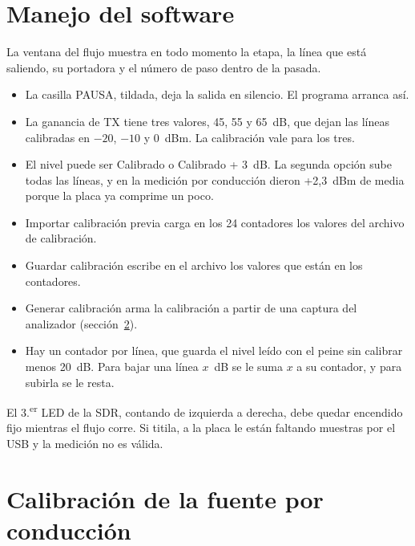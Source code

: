 
\section{Manejo del software}\label{anexo:sw}

La ventana del flujo muestra en todo momento la etapa, la línea que está saliendo, su portadora y el número de paso dentro de la pasada.

\begin{itemize}
  \item La casilla PAUSA, tildada, deja la salida en silencio. El programa arranca así.
  \item La ganancia de TX tiene tres valores, 45, 55 y 65~dB, que dejan las líneas calibradas en $-20$, $-10$ y 0~dBm. La calibración vale para los tres.
  \item El nivel puede ser Calibrado o Calibrado + 3~dB. La segunda opción sube todas las líneas, y en la medición por conducción dieron +2,3~dBm de media porque la placa ya comprime un poco.
  \item Importar calibración previa carga en los 24 contadores los valores del archivo de calibración.
  \item Guardar calibración escribe en el archivo los valores que están en los contadores.
  \item Generar calibración arma la calibración a partir de una captura del analizador (sección~\ref{anexo:cal}).
  \item Hay un contador por línea, que guarda el nivel leído con el peine sin calibrar menos 20~dB. Para bajar una línea $x$~dB se le suma $x$ a su contador, y para subirla se le resta.
\end{itemize}

El 3.\textsuperscript{er} LED de la SDR, contando de izquierda a derecha, debe quedar encendido fijo mientras el flujo corre. Si titila, a la placa le están faltando muestras por el USB y la medición no es válida.

\section{Calibración de la fuente por conducción}\label{anexo:cal}


